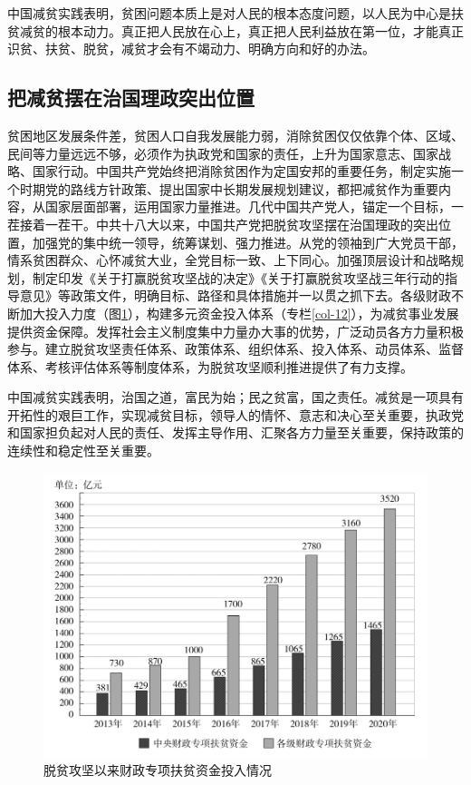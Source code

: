 \documentclass{ctexart}
\begin{document}
中国减贫实践表明，贫困问题本质上是对人民的根本态度问题，以人民为中心是扶贫减贫的根本动力。真正把人民放在心上，真正把人民利益放在第一位，才能真正识贫、扶贫、脱贫，减贫才会有不竭动力、明确方向和好的办法。

\subsection{把减贫摆在治国理政突出位置}

贫困地区发展条件差，贫困人口自我发展能力弱，消除贫困仅仅依靠个体、区域、民间等力量远远不够，必须作为执政党和国家的责任，上升为国家意志、国家战略、国家行动。中国共产党始终把消除贫困作为定国安邦的重要任务，制定实施一个时期党的路线方针政策、提出国家中长期发展规划建议，都把减贫作为重要内容，从国家层面部署，运用国家力量推进。几代中国共产党人，锚定一个目标，一茬接着一茬干。中共十八大以来，中国共产党把脱贫攻坚摆在治国理政的突出位置，加强党的集中统一领导，统筹谋划、强力推进。从党的领袖到广大党员干部，情系贫困群众、心怀减贫大业，全党目标一致、上下同心。加强顶层设计和战略规划，制定印发《关于打赢脱贫攻坚战的决定》《关于打赢脱贫攻坚战三年行动的指导意见》等政策文件，明确目标、路径和具体措施并一以贯之抓下去。各级财政不断加大投入力度（图\ref{fig-4}），构建多元资金投入体系（专栏\ref{col-12}），为减贫事业发展提供资金保障。发挥社会主义制度集中力量办大事的优势，广泛动员各方力量积极参与。建立脱贫攻坚责任体系、政策体系、组织体系、投入体系、动员体系、监督体系、考核评估体系等制度体系，为脱贫攻坚顺利推进提供了有力支撑。

中国减贫实践表明，治国之道，富民为始；民之贫富，国之责任。减贫是一项具有开拓性的艰巨工作，实现减贫目标，领导人的情怀、意志和决心至关重要，执政党和国家担负起对人民的责任、发挥主导作用、汇聚各方力量至关重要，保持政策的连续性和稳定性至关重要。

\begin{figure}[h]
    \centering
    \includegraphics{fig/4.jpg}
    \caption{脱贫攻坚以来财政专项扶贫资金投入情况}
    \label{fig-4}
\end{figure}
\end{document}
